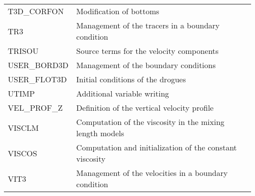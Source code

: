 \begin{tabular}{p{2.5in}p{4.0in}}
T3D\_CORFON  &  Modification of bottoms\\
TR3    & Management of the tracers in a boundary condition\\
TRISOU &  Source terms for the velocity components\\
USER\_BORD3D &  Management of the boundary conditions\\
USER\_FLOT3D       &  Initial conditions of the drogues\\
UTIMP  &  Additional variable writing\\
VEL\_PROF\_Z & Definition of the vertical velocity profile\\
VISCLM  & Computation of the viscosity in the mixing length models\\
VISCOS  &  Computation and initialization of the constant viscosity\\
VIT3    &  Management of the velocities in a boundary condition\\
\end{tabular}
